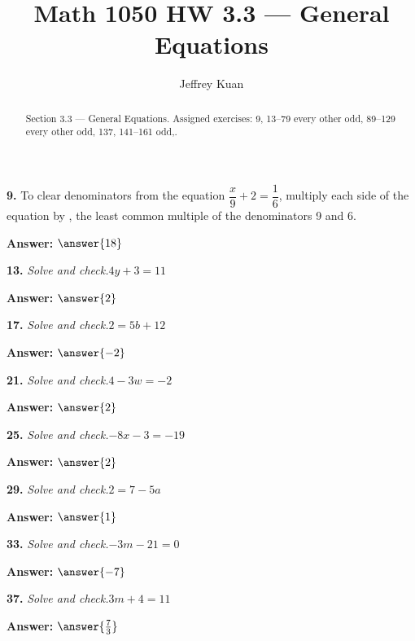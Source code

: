 \documentclass{ximera}
\author{Jeffrey Kuan}
\title{Math 1050 HW 3.3 --- General Equations}
\begin{document}
\begin{abstract}
    Section 3.3 --- General Equations.
    Assigned exercises: 9, 13–79 every other odd, 89–129 every other odd, 137, 141–161 odd,.
\end{abstract}

\maketitle

\begin{problem}
\textbf{9.} To clear denominators from the equation $\dfrac{x}{9} + 2 = \dfrac{1}{6}$,
  multiply each side of the equation by \blank, the least common multiple of the
  denominators 9 and 6.

\textbf{Answer:} $\answer{18}$
\end{problem}

\begin{problem}
\textbf{13.} \emph{Solve and check.}\quad $4y + 3 = 11$

\textbf{Answer:} $\answer{2}$
\end{problem}

\begin{problem}
\textbf{17.} \emph{Solve and check.}\quad $2 = 5b + 12$

\textbf{Answer:} $\answer{-2}$
\end{problem}

\begin{problem}
\textbf{21.} \emph{Solve and check.}\quad $4 - 3w = -2$

\textbf{Answer:} $\answer{2}$
\end{problem}

\begin{problem}
\textbf{25.} \emph{Solve and check.}\quad $-8x - 3 = -19$

\textbf{Answer:} $\answer{2}$
\end{problem}

\begin{problem}
\textbf{29.} \emph{Solve and check.}\quad $2 = 7 - 5a$

\textbf{Answer:} $\answer{1}$
\end{problem}

\begin{problem}
\textbf{33.} \emph{Solve and check.}\quad $-3m - 21 = 0$

\textbf{Answer:} $\answer{-7}$
\end{problem}

\begin{problem}
\textbf{37.} \emph{Solve and check.}\quad $3m + 4 = 11$

\textbf{Answer:} $\answer{\frac{7}{3}}$
\end{problem}
\end{document}
